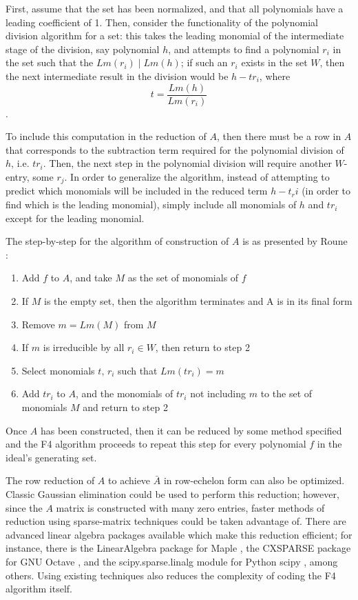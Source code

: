 \documentclass[letterpaper,12pt,titlepage,oneside,final]{book}
\begin{document}
First, assume that the set has been normalized, and that all polynomials have a leading coefficient of 1.  Then, consider the functionality of the polynomial division algorithm for a set: this takes the leading monomial of the intermediate stage of the division, say polynomial ${h}$, and attempts to find a polynomial ${r_i}$ in the set such that the ${Lm(r_i) \mid Lm(h)}$; if such an ${r_i}$ exists in the set ${W}$, then the next intermediate result in the division would be ${h - tr_i}$, where $${t = \frac{Lm(h)}{Lm(r_i)}}$$.  

To include this computation in the reduction of ${A}$, then there must be a row in ${A}$ that corresponds to the subtraction term required for the polynomial division of ${h}$, i.e. ${tr_i}$.  Then, the next step in the polynomial division will require another ${W}$-entry, some ${r_j}$.  In order to generalize the algorithm, instead of attempting to predict which monomials will be included in the reduced term ${h - t_ri}$ (in order to find which is the leading monomial), simply include all monomials of ${h}$ and ${tr_i}$ except for the leading monomial.

The step-by-step for the algorithm of construction of ${A}$ is as presented by Roune \cite{Roune}:
\begin{enumerate}
  \item Add ${f}$ to ${A}$, and take ${M}$ as the set of monomials of ${f}$
  \item If ${M}$ is the empty set, then the algorithm terminates and A is in its final form
  \item Remove $m = {Lm(M)}$ from ${M}$
  \item If ${m}$ is irreducible by all ${r_i \in W}$, then return to step 2
  \item Select monomials ${t,\, r_i}$ such that ${Lm(tr_i) = m}$
  \item Add ${tr_i}$ to ${A}$, and the monomials of ${tr_i}$ not including ${m}$ to the set of monomials ${M}$ and return to step 2
\end{enumerate}

Once ${A}$ has been constructed, then it can be reduced by some method specified and the F4 algorithm proceeds to repeat this step for every polynomial ${f}$ in the ideal's generating set.

The row reduction of ${A}$ to achieve ${\bar A}$ in row-echelon form can also be optimized.  Classic Gaussian elimination could be used to perform this reduction; however, since the ${A}$ matrix is constructed with many zero entries, faster methods of reduction using sparse-matrix techniques could be taken advantage of.  There are advanced linear algebra packages available which make this reduction efficient; for instance, there is the LinearAlgebra package for Maple \cite{MapleLinAlg}, the CXSPARSE package for GNU Octave \cite{OctaveLinAlg}, and the scipy.sparse.linalg module for Python scipy \cite{scipyLinAlg}, among others.  Using existing techniques also reduces the complexity of coding the F4 algorithm itself.  
\end{document}
